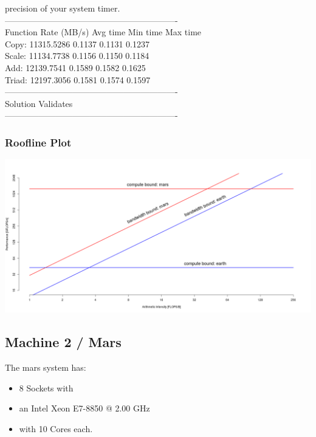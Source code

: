 \begin{itemize}
{		precision of your system timer. \\
		------------------------------------------------------------- \\
		Function      Rate (MB/s)   Avg time     Min time     Max time \\
		Copy:       11315.5286       0.1137       0.1131       0.1237 \\
		Scale:      11134.7738       0.1156       0.1150       0.1184 \\
		Add:        12139.7541       0.1589       0.1582       0.1625 \\
		Triad:      12197.3056       0.1581       0.1574       0.1597 \\
		------------------------------------------------------------- \\
		Solution Validates \\
		-------------------------------------------------------------
	}
	
	\newpage

\end{itemize}


\subsubsection{Roofline Plot}
\includegraphics[scale=0.4, angle=90]{roofline-earth-mars-pure.png}


\subsection{Machine 2 / Mars}

The mars system has:
 \begin{itemize}
 	\item 8 Sockets with
	\item an Intel Xeon E7-8850 @ 2.00 GHz
	\item with 10 Cores each.
\end{itemize}

